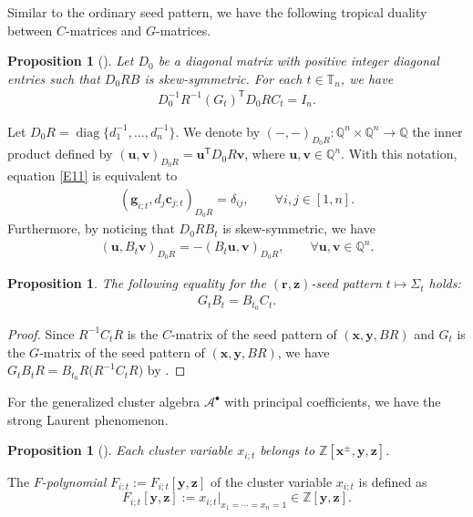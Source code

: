 \documentclass[11pt]{article}
\numberwithin{equation}{section}
\numberwithin{equation}{section}
\newtheorem{Proposition}[Theorem]{Proposition}
 { \theoremstyle{definition}
\newtheorem{Definition}[Theorem]{Definition}
\newtheorem{Note}[Theorem]{Note}
\newtheorem{Example}[Theorem]{Example}
\newtheorem{Remark}[Theorem]{Remark} }
\begin{document}
Similar to the ordinary seed pattern, we have the following tropical duality between $C$-matrices and $G$-matrices.
\begin{Proposition}[{\cite[Proposition 3.21]{Nakanishi14}}]\label{P4}
 Let $D_0$ be a diagonal matrix with positive integer diagonal entries such that $D_0RB$ is skew-symmetric. For each $t\in \mathbb{T}_n$, we have
\begin{align}\label{E11}
D_0^{-1}R^{-1}(G_t)^{\mathsf T}D_0RC_t=I_n.
\end{align}
\end{Proposition}
Let $D_0R=\operatorname{diag}\bigl\{d_1^{-1},\dots, d_n^{-1}\bigr\}$. We denote by $(-,-)_{D_0R}\colon \mathbb{Q}^n\times \mathbb{Q}^n\to \mathbb{Q}$ the inner product defined by $(\mathbf{u},\mathbf{v})_{D_0R}=\mathbf{u}^{\mathsf T}D_0R\mathbf{v}$, where $\mathbf{u},\mathbf{v}\in \mathbb{Q}^n$. With this notation, equation \eqref{E11} is equivalent to
\begin{align}\label{E12}
 (\mathbf{g}_{i;t},d_j\mathbf{c}_{j:t})_{D_0R}=\delta_{ij},\qquad \forall i,j\in[1,n].
\end{align}
Furthermore, by noticing that $D_0RB_t$ is skew-symmetric, we have
\begin{align*}
 (\mathbf{u},B_t\mathbf{v})_{D_0R}=-(B_t\mathbf{u},\mathbf{v})_{D_0R},\qquad \forall  \mathbf{u},\mathbf{v}\in \mathbb{Q}^n.
\end{align*}

\begin{Proposition}\label{P5}
 The following equality for the $(\mathbf{r},\mathbf{z})$-seed pattern $t\mapsto \Sigma_t$ holds:
 \begin{align}\label{E14}
 G_tB_t=B_{t_0}C_t.
 \end{align}
\end{Proposition}
\begin{proof}
Since $R^{-1}C_tR$ is the $C$-matrix of the seed pattern of $(\mathbf{x},\mathbf{y}, BR)$ and $G_t$ is the $G$-matrix of the seed pattern of $(\mathbf{x},\mathbf{y}, BR)$, we have
$
G_tB_tR=B_{t_0}R\bigl(R^{-1}C_tR\bigr)
$
by \cite[equation~(6.14)]{fomin_zelevinsky_2007}.
\end{proof}

For the generalized cluster algebra $\mathcal{A}^\bullet$ with principal coefficients, we have the strong Laurent phenomenon.
\begin{Proposition}[{\cite[Proposition 3.3]{Nakanishi14}}]
 Each cluster variable $x_{i;t}$ belongs to $\mathbb{Z}[\mathbf{x}^\pm,\mathbf{y},\mathbf{z}]$.
\end{Proposition}
\begin{Definition}
 The {\it $F$-polynomial} $F_{i;t}:=F_{i;t}[\mathbf{y},\mathbf{z}]$ of the cluster variable $x_{i;t}$ is defined as
 \[
 F_{i;t}[\mathbf{y},\mathbf{z}]:=x_{i;t}|_{x_1=\cdots=x_n=1}\in \mathbb{Z}[\mathbf{y},\mathbf{z}].
 \]
\end{Definition}
\end{document}
